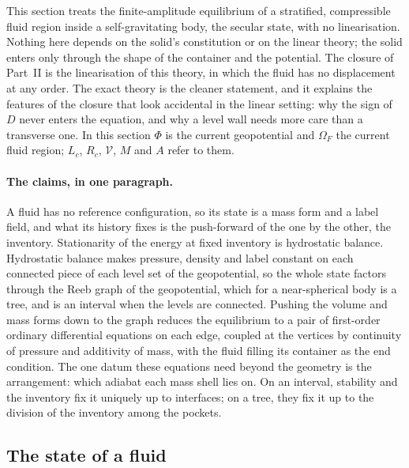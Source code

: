 \documentclass[11pt]{article}
\theoremstyle{definition}
\theoremstyle{remark}
\newcommand{\Vol}{\mathcal V}
\begin{document}
This section treats the finite-amplitude equilibrium of a stratified,
compressible fluid region inside a self-gravitating body, the secular
state, with no linearisation. Nothing here depends on the solid's
constitution or on the linear theory; the solid enters only through
the shape of the container and the potential. The closure of Part~II
is the linearisation of this theory, in which the fluid has no
displacement at any order. The exact theory is the cleaner statement,
and it explains the features of the closure that look accidental in
the linear setting: why the sign of $D$ never enters the equation,
and why a level wall needs more care than a transverse one. In this
section $\Phi$ is the current geopotential and $\Omega_F$ the current
fluid region; $L_c$, $R_c$, $\Vol$, $M$ and $A$ refer to them.

\paragraph{The claims, in one paragraph.} A fluid has no reference
configuration, so its state is a mass form and a label field, and
what its history fixes is the push-forward of the one by the other,
the inventory. Stationarity of the energy at fixed inventory is
hydrostatic balance. Hydrostatic balance makes pressure, density and
label constant on each connected piece of each level set of the
geopotential, so the whole state factors through the Reeb graph of
the geopotential, which for a near-spherical body is a tree, and is an
interval when the levels are connected. Pushing the volume and mass
forms down to the graph reduces the equilibrium to a pair of
first-order ordinary differential equations on each edge, coupled at
the vertices by continuity of pressure and additivity of mass, with
the fluid filling its container as the end condition. The one datum
these equations need beyond the geometry is the arrangement: which
adiabat each mass shell lies on. On an interval, stability and the
inventory fix it uniquely up to interfaces; on a tree, they fix it up
to the division of the inventory among the pockets.

\subsection{The state of a fluid}
\label{sec:state}
\end{document}
